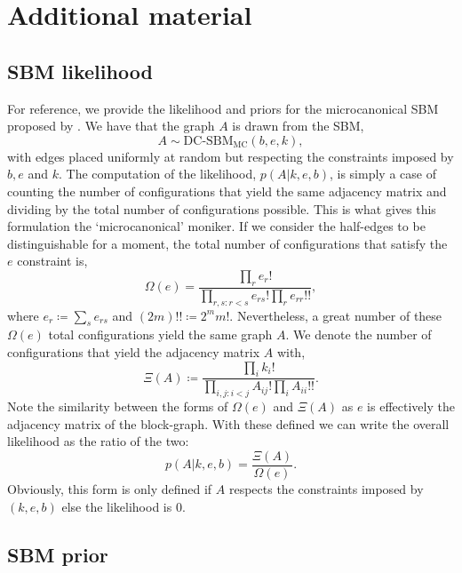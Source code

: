 \section{Additional material}

\subsection{SBM likelihood}
\label{appdx:sbm-likelihood}

For reference, we provide the likelihood and priors for the microcanonical SBM proposed by \citet{Peixoto-Bayesian-Microcanonical}. We have that the graph $A$ is drawn from the SBM,
%
\begin{equation}
	A \sim \textrm{DC-SBM}_{\textrm{MC}}(b, e, k),
\end{equation}
%
with edges placed uniformly at random but respecting the constraints imposed by $b, e$ and $k$. The computation of the likelihood, $p(A|k, e, b)$, is simply a case of counting the number of configurations that yield the same adjacency matrix and dividing by the total number of configurations possible. This is what gives this formulation the `microcanonical' moniker. If we consider the half-edges to be distinguishable for a moment, the total number of configurations that satisfy the $e$ constraint is,
%
\begin{equation}
	\Omega(e) = \frac{\prod_{r} e_r !}{\prod_{r,s : r < s} e_{rs}! \prod_{r} e_{rr}!!},
\end{equation}
%
where $e_r \coloneqq \sum_{s} e_{rs}$ and $(2m)!! \coloneqq 2^m m!$. Nevertheless, a great number of these $\Omega(e)$ total configurations yield the same graph $A$. We denote the number of configurations that yield the adjacency matrix $A$ with,
%
\begin{equation}
	\Xi(A) \coloneqq \frac{\prod_i k_i !}{\prod_{i,j : i < j} A_{ij} ! \prod_i A_{ii} !! }.
\end{equation}
%
Note the similarity between the forms of $\Omega(e)$ and $\Xi(A)$ as $e$ is effectively the adjacency matrix of the block-graph. With these defined we can write the overall likelihood as the ratio of the two:
%
\begin{equation}
	p(A|k,e,b) = \frac{\Xi(A)}{\Omega(e)}.
\end{equation}
%
Obviously, this form is only defined if $A$ respects the constraints imposed by $(k,e,b)$ else the likelihood is 0.

\subsection{SBM prior}
\label{appdx:sbm-prior}

